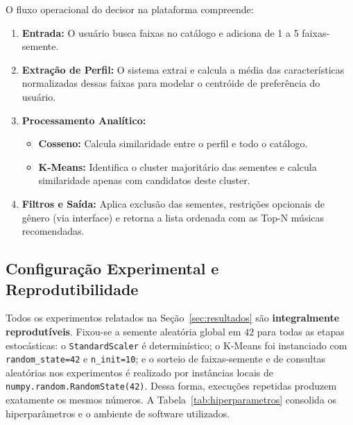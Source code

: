 \documentclass[12pt]{article}
\begin{document}
O fluxo operacional do decisor na plataforma compreende:
\begin{enumerate}
    \item \textbf{Entrada:} O usuário busca faixas no catálogo e adiciona de 1 a 5 faixas-semente.
    \item \textbf{Extração de Perfil:} O sistema extrai e calcula a média das características normalizadas dessas faixas para modelar o centróide de preferência do usuário.
    \item \textbf{Processamento Analítico:} 
    \begin{itemize}
        \item \textbf{Cosseno:} Calcula similaridade entre o perfil e todo o catálogo.
        \item \textbf{K-Means:} Identifica o cluster majoritário das sementes e calcula similaridade apenas com candidatos deste cluster.
    \end{itemize}
    \item \textbf{Filtros e Saída:} Aplica exclusão das sementes, restrições opcionais de gênero (via interface) e retorna a lista ordenada com as Top-N músicas recomendadas.
\end{enumerate}

\subsection{Configuração Experimental e Reprodutibilidade}
Todos os experimentos relatados na Seção~\ref{sec:resultados} são \textbf{integralmente reprodutíveis}. Fixou-se a semente aleatória global em $42$ para todas as etapas estocásticas: o \texttt{StandardScaler} é determinístico; o K-Means foi instanciado com \texttt{random\_state=42} e \texttt{n\_init=10}; e o sorteio de faixas-semente e de consultas aleatórias nos experimentos é realizado por instâncias locais de \texttt{numpy.random.RandomState(42)}. Dessa forma, execuções repetidas produzem exatamente os mesmos números. A Tabela~\ref{tab:hiperparametros} consolida os hiperparâmetros e o ambiente de software utilizados.
\end{document}
